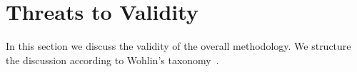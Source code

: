 \documentclass[10pt,journal,letterpaper,compsoc]{IEEEtran}
\begin{document}
\section{Threats to Validity} \label{valt} 

In this section we discuss the validity of the overall methodology. 
We structure the discussion according to Wohlin's taxonomy~\cite{Wohlin2000}.


\end{document}
